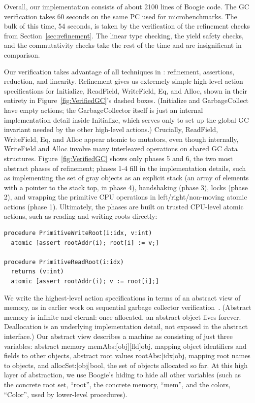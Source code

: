 Overall, our implementation consists of about 2100 lines of Boogie code.
The GC verification takes 60 seconds on the same PC used for microbenchmarks.
The bulk of this time, 54 seconds, is taken by the verification of the refinement checks from Section~\ref{sec:refinement}.
The linear type checking, the yield safety checks, and the commutativity checks take the rest of the time and are insignificant in comparison.

Our verification takes advantage of all techniques in \civl: refinement, assertions, reduction, and linearity.
Refinement gives us extremely simple high-level action specifications for Initialize, ReadField, WriteField, Eq, and Alloc,
shown in their entirety in Figure~\ref{fig:VerifiedGC}'s dashed boxes.
(Initialize and GarbageCollect have empty actions; the GarbageCollector itself is just an internal implementation detail inside Initialize,
which serves only to set up the global GC invariant needed by the other high-level actions.)
Crucially, ReadField, WriteField, Eq, and Alloc appear atomic to mutators, even though internally,
WriteField and Alloc involve many interleaved operations on shared GC data structures.
Figure~\ref{fig:VerifiedGC} shows only phases 5 and 6, the two most abstract phases of refinement;
phases 1-4 fill in the implementation details,
such as implementing the set of gray objects as an explicit stack (an array of elements with a pointer to the stack top, in phase 4),
handshaking (phase 3), locks (phase 2), and wrapping the primitive CPU operations in left/right/non-moving atomic actions (phase 1).
Ultimately, the phases are built on trusted CPU-level atomic actions, such as reading and writing roots directly:

\begin{verbatim}
procedure PrimitiveWriteRoot(i:idx, v:int)
  atomic [assert rootAddr(i); root[i] := v;]

procedure PrimitiveReadRoot(i:idx)
  returns (v:int)
  atomic [assert rootAddr(i); v := root[i];]
\end{verbatim}

We write the highest-level action specifications in terms of an abstract view of memory,
as in earlier work on sequential garbage collector verification~\cite{mccr07,hawb09}.
(Abstract memory is infinite and eternal: once allocated, an abstract object lives forever.
Deallocation is an underlying implementation detail, not exposed in the abstract interface.)
Our abstract view describes a machine as consisting of just three variables:
abstract memory memAbs:[obj][fld]obj, mapping object identifiers and fields to other objects,
abstract root values rootAbs:[idx]obj, mapping root names to objects, and
allocSet:[obj]bool, the set of objects allocated so far.
At this high layer of abstraction, we use Boogie's hiding to hide all other variables
(such as the concrete root set, ``root'', the concrete memory, ``mem'', and the colors, ``Color'', used by lower-level procedures).

